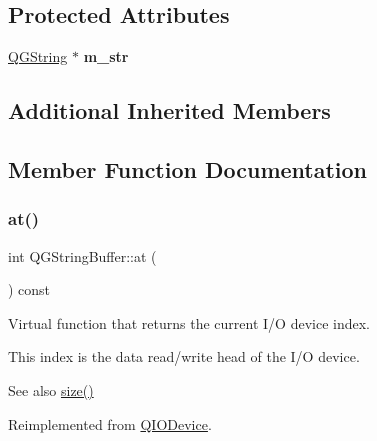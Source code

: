 \subsection*{Protected Attributes}
\begin{DoxyCompactItemize}
\item 
\mbox{\label{class_q_g_string_buffer_a7ba16cdff0574da370cdc1bcf1cdf9ea}} 
\mbox{\hyperlink{class_q_g_string}{Q\+G\+String}} $\ast$ {\bfseries m\+\_\+str}
\end{DoxyCompactItemize}
\subsection*{Additional Inherited Members}


\subsection{Member Function Documentation}
\mbox{\label{class_q_g_string_buffer_a8aa888c83b2a77c20fb60fa7d07a143b}} 
\subsubsection{\texorpdfstring{at()}{at()}\hspace{0.1cm}{\footnotesize\ttfamily [1/2]}}
{\footnotesize\ttfamily int Q\+G\+String\+Buffer\+::at (\begin{DoxyParamCaption}{ }\end{DoxyParamCaption}) const\hspace{0.3cm}{\ttfamily [virtual]}}

Virtual function that returns the current I/O device index.

This index is the data read/write head of the I/O device.

\begin{DoxySeeAlso}{See also}
\mbox{\hyperlink{class_q_g_string_buffer_ad7206e39b7cc87a42717ded03d700cd8}{size()}} 
\end{DoxySeeAlso}


Reimplemented from \mbox{\hyperlink{class_q_i_o_device_a0dee1db4a9e506924ccac6982ffdf3df}{Q\+I\+O\+Device}}.

\mbox{\label{class_q_g_string_buffer_ab1bcf1133571fd71797ad11d5d7f3cb4}} 
